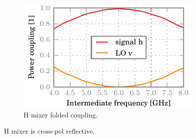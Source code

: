 \begin{figure}[hbtp]
    \\
    \begin{subfigure}[b]{.5\textwidth}
        \includegraphics{chapter_3/03_mh_cr_h_ssb}%
        \caption{H mixer folded coupling.}
    \end{subfigure}%
    \caption{H mixer is cross-pol reflective.}
    \label{fig:03_mh_cr}
\end{figure}


